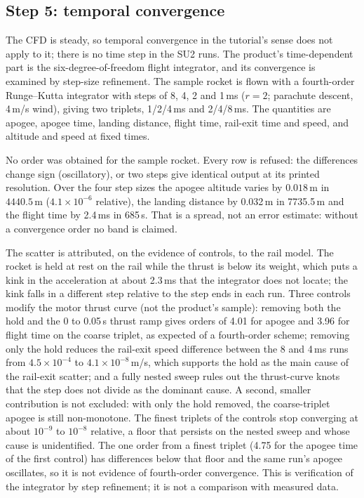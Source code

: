 \documentclass[11pt,a4paper]{article}
\begin{document}
\subsection{Step 5: temporal convergence}
\label{sec:temporal}

The CFD is steady, so temporal convergence in the tutorial's sense does not apply to it; there is no time step in the
SU2 runs.
The product's time-dependent part is the six-degree-of-freedom flight integrator, and its convergence is examined
by step-size refinement.
The sample rocket is flown with a fourth-order Runge--Kutta integrator with steps of 8, 4, 2 and 1\,ms
($r=2$; parachute descent, 4\,m/s wind), giving two triplets, 1/2/4\,ms and 2/4/8\,ms.
The quantities are apogee, apogee time, landing distance, flight time, rail-exit time and speed, and altitude and speed at
fixed times.

No order was obtained for the sample rocket.
Every row is refused: the differences change sign (oscillatory), or two steps give identical output at its printed
resolution.
Over the four step sizes the apogee altitude varies by $0.018$\,m in $4440.5$\,m ($4.1\times10^{-6}$ relative), the landing
distance by 0.032\,m in 7735.5\,m and the flight time by 2.4\,ms in 685\,s.
That is a spread, not an error estimate: without a convergence order no band is claimed.

The scatter is attributed, on the evidence of controls, to the rail model.
The rocket is held at rest on the rail while the thrust is below its weight, which puts a kink in the acceleration at
about 2.3\,ms that the integrator does not locate; the kink falls in a different step relative to the step ends in each run.
Three controls modify the motor thrust curve (not the product's sample):
removing both the hold and the 0 to 0.05\,s thrust ramp gives orders of 4.01 for apogee and 3.96 for flight time on
the coarse triplet, as expected of a fourth-order scheme;
removing only the hold reduces the rail-exit speed difference between the 8 and 4\,ms runs from $4.5\times10^{-4}$ to
$4.1\times10^{-8}$\,m/s, which supports the hold as the main cause of the rail-exit scatter;
and a fully nested sweep rules out the thrust-curve knots that the step does not divide as the dominant cause.
A second, smaller contribution is not excluded: with only the hold removed, the coarse-triplet apogee is still
non-monotone.
The finest triplets of the controls stop converging at about $10^{-9}$ to $10^{-8}$ relative, a floor that
persists on the nested sweep and whose cause is unidentified.
The one order from a finest triplet (4.75 for the apogee time of the first control) has differences below that
floor and the same run's apogee oscillates, so it is not evidence of fourth-order convergence.
This is verification of the integrator by step refinement; it is not a comparison with measured data.
\end{document}
